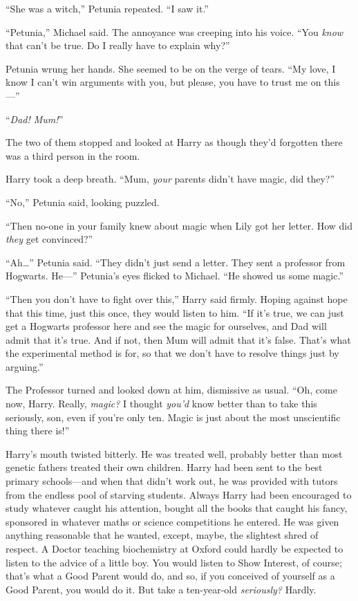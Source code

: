 “She was a witch,” Petunia repeated. “I saw it.”

“Petunia,” Michael said. The annoyance was creeping into his voice. “You \emph{know} that can’t be true. Do I really have to explain why?”

Petunia wrung her hands. She seemed to be on the verge of tears. “My love, I know I can’t win arguments with you, but please, you have to trust me on this—”

“\emph{Dad! Mum!}”

The two of them stopped and looked at Harry as though they’d forgotten there was a third person in the room.

Harry took a deep breath. “Mum, \emph{your} parents didn’t have magic, did they?”

“No,” Petunia said, looking puzzled.

“Then no-one in your family knew about magic when Lily got her letter. How did \emph{they} get convinced?”

“Ah…” Petunia said. “They didn’t just send a letter. They sent a professor from Hogwarts. He—” Petunia’s eyes flicked to Michael. “He showed us some magic.”

“Then you don’t have to fight over this,” Harry said firmly. Hoping against hope that this time, just this once, they would listen to him. “If it’s true, we can just get a Hogwarts professor here and see the magic for ourselves, and Dad will admit that it’s true. And if not, then Mum will admit that it’s false. That’s what the experimental method is for, so that we don’t have to resolve things just by arguing.”

The Professor turned and looked down at him, dismissive as usual. “Oh, come now, Harry. Really, \emph{magic?} I thought \emph{you’d} know better than to take this seriously, son, even if you’re only ten. Magic is just about the most unscientific thing there is!”

Harry’s mouth twisted bitterly. He was treated well, probably better than most genetic fathers treated their own children. Harry had been sent to the best primary schools—and when that didn’t work out, he was provided with tutors from the endless pool of starving students. Always Harry had been encouraged to study whatever caught his attention, bought all the books that caught his fancy, sponsored in whatever maths or science competitions he entered. He was given anything reasonable that he wanted, except, maybe, the slightest shred of respect. A Doctor teaching biochemistry at Oxford could hardly be expected to listen to the advice of a little boy. You would listen to Show Interest, of course; that’s what a Good Parent would do, and so, if you conceived of yourself as a Good Parent, you would do it. But take a ten-year-old \emph{seriously?} Hardly.

